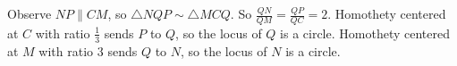 Observe $NP\parallel CM$, so $\triangle{NQP}\sim\triangle{MCQ}$. So $\frac{QN}{QM}=\frac{QP}{QC}=2$. Homothety centered at $C$ with ratio $\frac{1}{3}$ sends $P$ to $Q$, so the locus of $Q$ is a circle. Homothety centered at $M$ with ratio $3$ sends $Q$ to $N$, so the locus of $N$ is a circle.